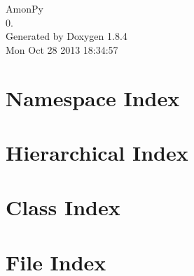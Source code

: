 \documentclass[twoside]{book}
\newcommand{\clearemptydoublepage}{%
  \newpage{\pagestyle{empty}\cleardoublepage}%
}
\begin{document}
\hypersetup{pageanchor=false}
\begin{titlepage}
\vspace*{7cm}
\begin{center}%
{\Large Amon\-Py \\[1ex]\large 0. }\\
\vspace*{1cm}
{\large Generated by Doxygen 1.8.4}\\
\vspace*{0.5cm}
{\small Mon Oct 28 2013 18:34:57}\\
\end{center}
\end{titlepage}
\clearemptydoublepage
\tableofcontents
\clearemptydoublepage
{}
\hypersetup{pageanchor=true}

\chapter{Namespace Index}

\chapter{Hierarchical Index}

\chapter{Class Index}

\chapter{File Index}

\end{document}
